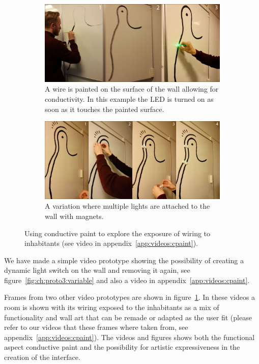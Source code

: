 \begin{figure}[h]
  \centering
  \begin{subfigure}[t]{.9\textwidth}
    \centering
    \includegraphics[width=.9\textwidth]{figures/proto3/wallpaint-1}
    \caption{A wire is painted on the surface of the wall allowing for conductivity. In this example the LED is turned on as soon as it touches the painted surface.}
  \end{subfigure}
  \begin{subfigure}[t]{.9\textwidth}
    \vspace{0.2cm}
    \centering
    \includegraphics[width=.9\textwidth]{figures/proto3/wallpaint-2}
    \caption{A variation where multiple lights are attached to the wall with magnets.}
  \end{subfigure}
  \caption[Using conductive paint to explore the exposure of wiring.]
  {Using conductive paint to explore the exposure of wiring to inhabitants (see video in appendix~\ref{app:videos:cpaint}).}
  \label{fig:ch:proto3:wallpaint}
\end{figure}

We have made a simple video prototype showing the possibility of creating a dynamic light switch on the wall and removing it again, see figure~\ref{fig:ch:proto3:variable} and also a video in appendix~\ref{app:videos:cpaint}.

Frames from two other video prototypes are shown in figure~\ref{fig:ch:proto3:wallpaint}.
In these videos a room is shown with its wiring exposed to the inhabitants as a mix of functionality and wall art that can be remade or adapted as the user fit (please refer to our videos that these frames where taken from, see appendix~\ref{app:videos:cpaint}).
The videos and figures shows both the functional aspect conductive paint and the possibility for artistic expressiveness in the creation of the interface.


